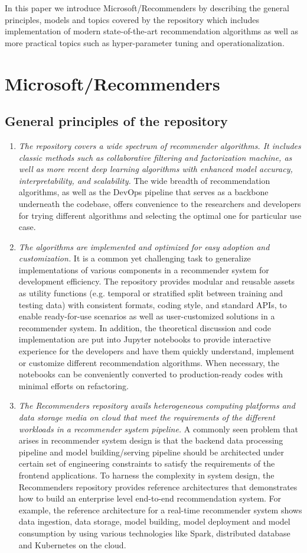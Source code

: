 \documentclass[twoside,11pt]{article}
\begin{document}
In this paper we introduce Microsoft/Recommenders by describing the general principles, models and topics covered by the repository which includes implementation of modern state-of-the-art recommendation algorithms as well as more practical topics such as hyper-parameter tuning and operationalization.

\section{Microsoft/Recommenders}
\subsection{General principles of the repository}
\begin{enumerate}
\item \emph{The repository covers a wide spectrum of recommender algorithms. It includes classic methods such as collaborative filtering and factorization machine, as well as more recent deep learning algorithms with enhanced model accuracy, interpretability, and scalability.} The wide breadth of recommendation algorithms, as well as the DevOps pipeline that serves as a backbone underneath the codebase, offers convenience to the researchers and developers for trying different algorithms and selecting the optimal one for particular use case. 
\item \emph{The algorithms are implemented and optimized for easy adoption and customization.} It is a common yet challenging task to generalize implementations of various components in a recommender system for development efficiency. The repository provides modular and reusable assets as utility functions (e.g. temporal or stratified split between training and testing data) with consistent formats, coding style, and standard APIs, to enable ready-for-use scenarios as well as user-customized solutions in a recommender system. In addition, the theoretical discussion and code implementation are put into Jupyter notebooks to provide interactive experience for the developers and have them quickly understand, implement or customize different recommendation algorithms. When necessary, the notebooks can be conveniently converted to production-ready codes with minimal efforts on refactoring. 
\item \emph{The Recommenders repository avails heterogeneous computing platforms and data storage media on cloud that meet the requirements of the different workloads in a recommender system pipeline.} A commonly seen problem that arises in recommender system design is that the backend data processing pipeline and model building/serving pipeline should be architected under certain set of engineering constraints to satisfy the requirements of the frontend applications. To harness the complexity in system design, the Recommenders repository provides reference architectures that demonstrates how to build an enterprise level end-to-end recommendation system. For example, the reference architecture for a real-time recommender system shows data ingestion, data storage, model building, model deployment and model consumption by using various technologies like Spark, distributed database and Kubernetes on the cloud. 

\end{enumerate}
\end{document}
